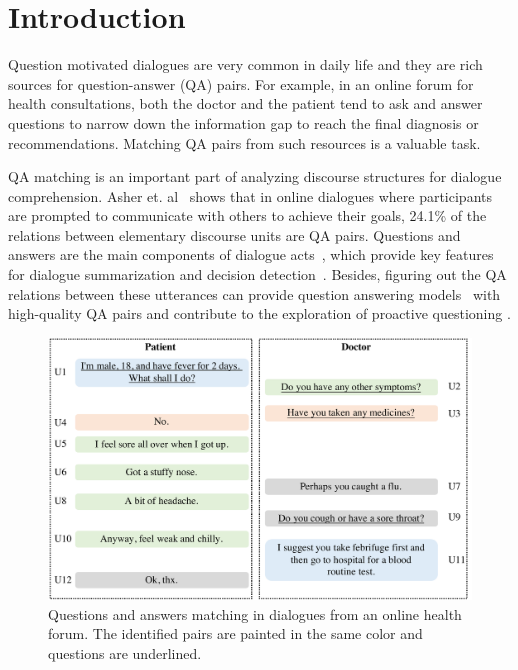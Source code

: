 \section{Introduction}
\label{sec:intro}
Question motivated dialogues are very common in daily life and 
they are rich sources for question-answer (QA) pairs. 
For example, in an online forum for health consultations, 
both the doctor and the patient tend to ask and answer questions to 
narrow down the information gap to reach the final diagnosis or 
recommendations. Matching QA pairs from such resources is a valuable task. 

QA matching is an important part of analyzing discourse structures 
for dialogue comprehension. Asher et. al~ 
shows that in online dialogues where participants are prompted to 
communicate with others to achieve their goals, 24.1\% of the relations 
between elementary discourse units are QA pairs. 
Questions and answers are the main components of 
dialogue acts~\cite{stolcke2000dialogue}, which provide key features for 
dialogue summarization and decision detection~\cite{fernandez2008modelling}. 
Besides, figuring out the QA relations between these utterances can 
provide question answering 
models~\cite{ji2014information,vinyals2015neural,cui2017superagent} with 
high-quality QA pairs and contribute to the exploration of proactive questioning \cite{yan2017building}.

\begin{figure}[t]
	\centering
	\includegraphics[scale=0.29]{pictures/figure3.pdf}
	\caption{Questions and answers matching in dialogues from an online health forum. The identified pairs are painted in the same color and questions are underlined.}
	\label{fig:sample}
\end{figure}

